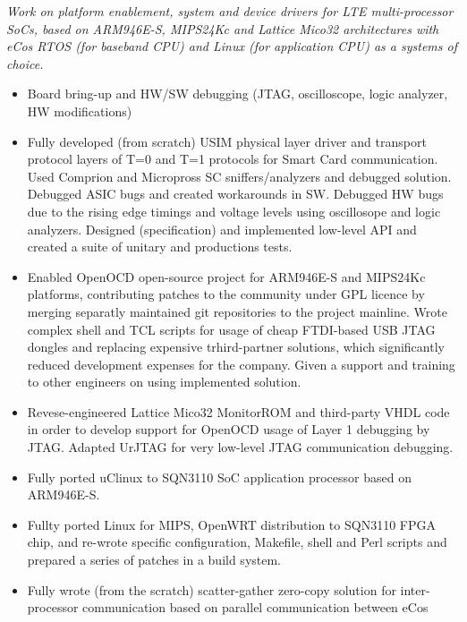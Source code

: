 \documentclass[a4paper, oneside, final]{scrartcl}
\begin{document}
\medskip

   \textit{Work on platform enablement, system and device drivers for LTE
   multi-processor SoCs, based on ARM946E-S, MIPS24Kc and Lattice Mico32
   architectures with eCos RTOS (for baseband CPU) and Linux (for application CPU)
   as a systems of choice.}

\begin{itemize}
   \item Board bring-up and HW/SW debugging (JTAG, oscilloscope,
         logic analyzer, HW modifications)
   \item Fully developed (from scratch) USIM physical layer driver and
            transport protocol layers of T=0 and T=1 protocols for Smart Card
            communication. Used Comprion and Micropross SC sniffers/analyzers
            and debugged solution. Debugged ASIC bugs and created workarounds
            in SW. Debugged HW bugs due to the rising edge timings and voltage
            levels using oscillosope and logic analyzers. 
            Designed (specification) and implemented low-level API and 
            created a suite of unitary and productions tests.
   \item Enabled OpenOCD open-source project for ARM946E-S and MIPS24Kc
            platforms, contributing patches to the community under GPL
            licence by merging separatly maintained git repositories to the
            project mainline. Wrote complex shell and TCL scripts for usage of cheap
            FTDI-based USB JTAG dongles and replacing expensive trhird-partner solutions,
            which significantly reduced development expenses for the company.
            Given a support and training to other engineers on using
            implemented solution. 
   \item Revese-engineered Lattice Mico32 MonitorROM and third-party VHDL code
            in order to develop support for OpenOCD usage of Layer 1 debugging by
            JTAG. Adapted UrJTAG for very low-level JTAG communication debugging.
   \item Fully ported uClinux to SQN3110 SoC application processor based on
            ARM946E-S.
   \item Fullty ported Linux for MIPS, OpenWRT distribution to SQN3110 FPGA
            chip, and re-wrote specific configuration, Makefile, shell and Perl scripts
            and prepared a series of patches in a build system.
   \item Fully wrote (from the scratch) scatter-gather zero-copy solution for
            inter-processor communication based on parallel communication between eCos

\end{itemize}
\end{document}

